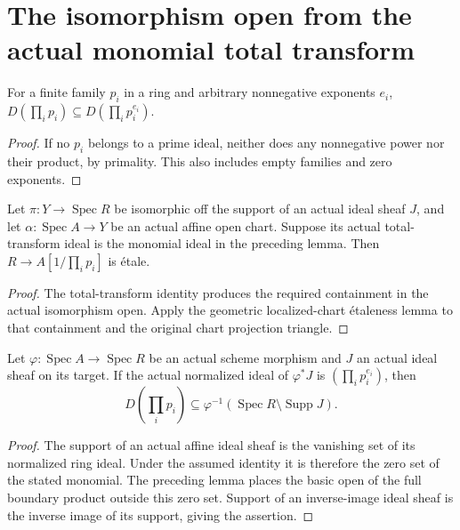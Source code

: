 \section{The isomorphism open from the actual monomial total transform}

\begin{lemma}\label{lem:sc0-basic-boundary-monomial-open}
\leanok
For a finite family $p_i$ in a ring and arbitrary nonnegative exponents $e_i$,
$D(\prod_i p_i)\subseteq D(\prod_i p_i^{e_i})$.
\end{lemma}
\begin{proof}
If no $p_i$ belongs to a prime ideal, neither does any nonnegative power nor
their product, by primality. This also includes empty families and zero exponents.
\end{proof}

\begin{lemma}\label{lem:sc0-monomial-transform-boundary-etale}
\leanok
{}
Let $\pi:Y\to\operatorname{Spec}R$ be isomorphic off the support of an actual
ideal sheaf $J$, and let $\alpha:\operatorname{Spec}A\to Y$ be an actual affine
open chart. Suppose its actual total-transform ideal is the monomial ideal in
the preceding lemma. Then $R\to A[1/\prod_i p_i]$ is \'etale.
\end{lemma}
\begin{proof}
The total-transform identity produces the required containment in the actual
isomorphism open. Apply the geometric localized-chart \'etaleness lemma to that
containment and the original chart projection triangle.
\end{proof}

\begin{lemma}\label{lem:sc0-monomial-transform-open-containment}
\leanok
{}
Let $\varphi:\operatorname{Spec}A\to\operatorname{Spec}R$ be an actual scheme
morphism and $J$ an actual ideal sheaf on its target. If the actual normalized
ideal of $\varphi^*J$ is $(\prod_i p_i^{e_i})$, then
\[
 D(\prod_i p_i)\subseteq\varphi^{-1}(\operatorname{Spec}R\setminus\operatorname{Supp}J).
\]
\end{lemma}
\begin{proof}
The support of an actual affine ideal sheaf is the vanishing set of its normalized
ring ideal. Under the assumed identity it is therefore the zero set of the stated
monomial. The preceding lemma places the basic open of the full boundary product
outside this zero set. Support of an inverse-image ideal sheaf is the inverse
image of its support, giving the assertion.
\end{proof}
